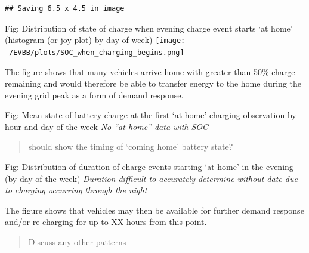 \documentclass[]{article}
\begin{document}
\begin{verbatim}
## Saving 6.5 x 4.5 in image
\end{verbatim}

Fig: Distribution of state of charge when evening charge event starts
`at home' (histogram (or joy plot) by day of week)
\texttt{[image: ~/EVBB/plots/SOC\_when\_charging\_begins.png]}

The figure shows that many vehicles arrive home with greater than 50\%
charge remaining and would therefore be able to transfer energy to the
home during the evening grid peak as a form of demand response.

Fig: Mean state of battery charge at the first `at home' charging
observation by hour and day of the week \emph{No ``at home'' data with
SOC}

\begin{quote}
should show the timing of `coming home' battery state?
\end{quote}

Fig: Distribution of duration of charge events starting `at home' in the
evening (by day of the week) \emph{Duration difficult to accurately
determine without date due to charging occurring through the night}

The figure shows that vehicles may then be available for further demand
response and/or re-charging for up to XX hours from this point.

\begin{quote}
Discuss any other patterns
\end{quote}
\end{document}
